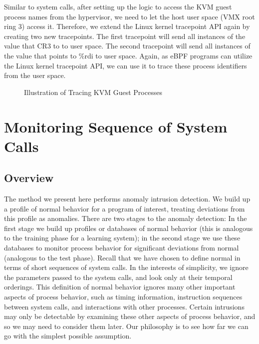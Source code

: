 \documentclass{report}
\begin{document}
\begin{spacing}{1.5}
{\large
Similar to system calls, after setting up the logic to access the KVM guest process names from the hypervisor, we need to let the host user space (VMX root ring 3) access it. Therefore, we extend the Linux kernel tracepoint API again by creating two new tracepoints. The first tracepoint will send all instances of the value that CR3 to to user space. The second tracepoint will send all instances of the value that points to \%rdi to user space. Again, as eBPF programs can utilize the Linux kernel tracepoint API, we can use it to trace these process identifiers from the user space.  
\newline
}


\newpage
\vfill
{}
\begin{figure}[ht]
\centering
  \caption{Illustration of Tracing KVM Guest Processes}
\end{figure}













\section{Monitoring Sequence of System Calls}


\subsection{Overview}

The method we present here performs anomaly intrusion detection. We build up a profile of normal behavior
for a program of interest, treating deviations from this profile as anomalies. There are two
stages to the anomaly detection: In the first stage we build up profiles or databases of
normal behavior (this is analogous to the training phase for a learning system); in the
second stage we use these databases to monitor process behavior for significant
deviations from normal (analogous to the test phase).
Recall that we have chosen to define normal in terms of short sequences of system calls.
In the interests of simplicity, we ignore the parameters passed to the system calls, and
look only at their temporal orderings. This definition of normal behavior ignores many
other important aspects of process behavior, such as timing information, instruction
sequences between system calls, and interactions with other processes. Certain intrusions
may only be detectable by examining these other aspects of process behavior, and so we
may need to consider them later. Our philosophy is to see how far we can go with the
simplest possible assumption.


\end{spacing}
\end{document}
